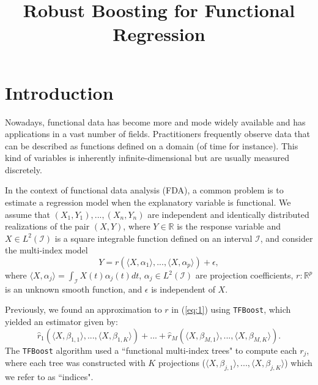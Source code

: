 \documentclass{article}
\title{Robust Boosting for Functional Regression}
\let\oldref\ref
\renewcommand{\ref}[1]{(\oldref{#1})}
\begin{document}
\maketitle

\section{Introduction}
Nowadays, functional data has become more and mode widely available and has applications in a vast number of fields. Practitioners frequently observe data that can be described as functions defined on a domain (of time for instance). This kind of variables is inherently infinite-dimensional but are usually measured discretely.  

In the context of functional data analysis (FDA), a common problem is to estimate a regression model when the explanatory variable is functional. We assume that $(X_1, Y_1), ..., (X_n, Y_n)$ are independent and identically distributed realizations of the pair $(X, Y)$, where $Y\in \mathbb{R}$ is the response variable and $X \in L^2(\mathcal{I})$ is a square integrable function defined on an interval $\mathcal{I}$, and consider the multi-index model 
\begin{equation}\label{eq:1}
	Y = r(\langle X, \alpha_1 \rangle, ...,\langle X, \alpha_p \rangle ) + \epsilon,
\end{equation}
where $\langle X, \alpha_j \rangle = \int_{\mathcal{I}} X(t)\alpha_j(t)dt$, $\alpha_j \in L^2(\mathcal{I})$ are projection coefficients, $r: \mathbb{R}^p$ is an unknown smooth function, and $\epsilon$ is independent of $X$. 

 Previously, we found an approximation to $r$ in \ref{eq:1} using \texttt{TFBoost}, which yielded an estimator given by:
\begin{equation} 
\hat{r}_1(\langle X, \beta_{1,1} \rangle, ...,\langle X, \beta_{1,K}  \rangle) + ... + \hat{r}_M(\langle X, \beta_{M,1} \rangle, ...,\langle X, \beta_{M,K}  \rangle).
\end{equation}
The \texttt{TFBoost} algorithm used a ``functional multi-index trees" to compute each $r_j$, where each tree was constructed with $K$ projections ($\langle X, \beta_{j,1} \rangle, ...,\langle X, \beta_{j,K}  \rangle$) which we refer to as ``indices".  
\end{document}
